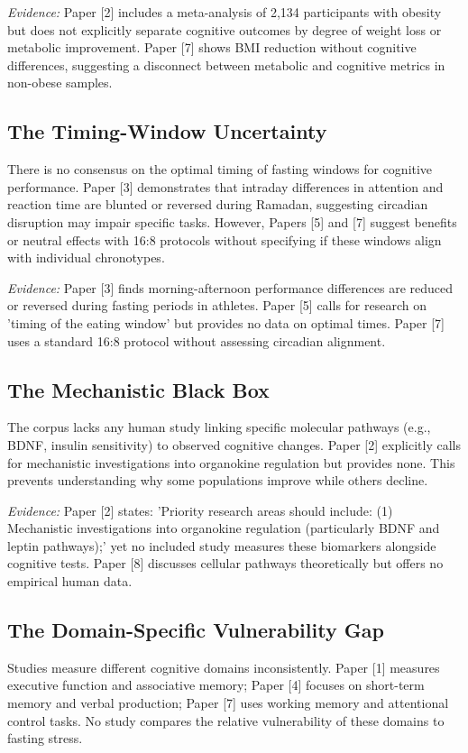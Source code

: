 \documentclass[conference]{IEEEtran}
\begin{document}
\textit{Evidence:} Paper [2] includes a meta-analysis of 2,134 participants with obesity but does not explicitly separate cognitive outcomes by degree of weight loss or metabolic improvement. Paper [7] shows BMI reduction without cognitive differences, suggesting a disconnect between metabolic and cognitive metrics in non-obese samples.

\subsection{The Timing-Window Uncertainty}
There is no consensus on the optimal timing of fasting windows for cognitive performance. Paper [3] demonstrates that intraday differences in attention and reaction time are blunted or reversed during Ramadan, suggesting circadian disruption may impair specific tasks. However, Papers [5] and [7] suggest benefits or neutral effects with 16:8 protocols without specifying if these windows align with individual chronotypes.

\textit{Evidence:} Paper [3] finds morning-afternoon performance differences are reduced or reversed during fasting periods in athletes. Paper [5] calls for research on 'timing of the eating window' but provides no data on optimal times. Paper [7] uses a standard 16:8 protocol without assessing circadian alignment.

\subsection{The Mechanistic Black Box}
The corpus lacks any human study linking specific molecular pathways (e.g., BDNF, insulin sensitivity) to observed cognitive changes. Paper [2] explicitly calls for mechanistic investigations into organokine regulation but provides none. This prevents understanding why some populations improve while others decline.

\textit{Evidence:} Paper [2] states: 'Priority research areas should include: (1) Mechanistic investigations into organokine regulation (particularly BDNF and leptin pathways);' yet no included study measures these biomarkers alongside cognitive tests. Paper [8] discusses cellular pathways theoretically but offers no empirical human data.

\subsection{The Domain-Specific Vulnerability Gap}
Studies measure different cognitive domains inconsistently. Paper [1] measures executive function and associative memory; Paper [4] focuses on short-term memory and verbal production; Paper [7] uses working memory and attentional control tasks. No study compares the relative vulnerability of these domains to fasting stress.
\end{document}
